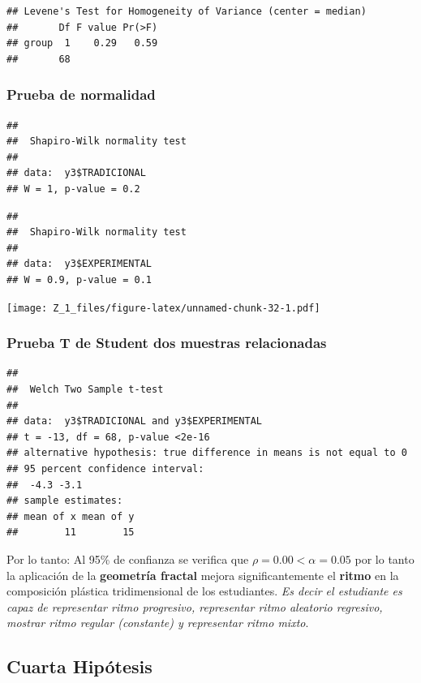 \documentclass[12pt,]{report}
\begin{document}
\begin{verbatim}
## Levene's Test for Homogeneity of Variance (center = median)
##       Df F value Pr(>F)
## group  1    0.29   0.59
##       68
\end{verbatim}

\hypertarget{prueba-de-normalidad-2}{%
\subsubsection{Prueba de normalidad}\label{prueba-de-normalidad-2}}

\begin{verbatim}
## 
##  Shapiro-Wilk normality test
## 
## data:  y3$TRADICIONAL
## W = 1, p-value = 0.2
\end{verbatim}

\begin{verbatim}
## 
##  Shapiro-Wilk normality test
## 
## data:  y3$EXPERIMENTAL
## W = 0.9, p-value = 0.1
\end{verbatim}

\texttt{[image: Z\_1\_files/figure-latex/unnamed-chunk-32-1.pdf]}

\hypertarget{prueba-t-de-student-dos-muestras-relacionadas-2}{%
\subsubsection{Prueba T de Student dos muestras relacionadas}\label{prueba-t-de-student-dos-muestras-relacionadas-2}}

\begin{verbatim}
## 
##  Welch Two Sample t-test
## 
## data:  y3$TRADICIONAL and y3$EXPERIMENTAL
## t = -13, df = 68, p-value <2e-16
## alternative hypothesis: true difference in means is not equal to 0
## 95 percent confidence interval:
##  -4.3 -3.1
## sample estimates:
## mean of x mean of y 
##        11        15
\end{verbatim}

Por lo tanto: Al 95\% de confianza se verifica que \(\rho=0.00<\alpha=0.05\) por lo tanto la aplicación
de la \textbf{geometría fractal} mejora significantemente el \textbf{ritmo} en la composición plástica
tridimensional de los estudiantes. \emph{Es decir el estudiante es capaz de representar ritmo progresivo,
representar ritmo aleatorio regresivo, mostrar ritmo regular (constante) y representar
ritmo mixto}.

\hypertarget{cuarta-hipuxf3tesis}{%
\subsection{Cuarta Hipótesis}\label{cuarta-hipuxf3tesis}}
\end{document}
